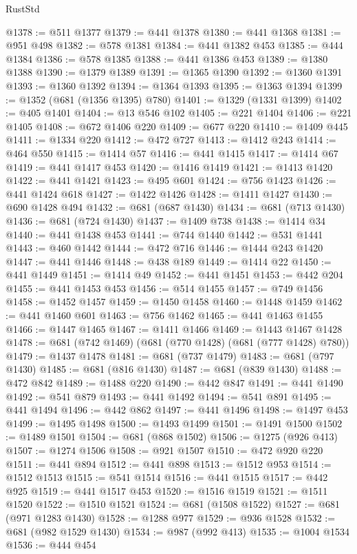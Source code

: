 \begin{lexlean}{RustStd}
\begin{coremodule}
{\begin{coremodule}
{{{{{{{{{{{{{{{{{{{{{{{{{@1378 := @511 @1377
@1379 := @441 @1378
@1380 := @441 @1368
@1381 := @951 @498
@1382 := @578 @1381
@1384 := @441 @1382 @453
@1385 := @444 @1384
@1386 := @578 @1385
@1388 := @441 @1386 @453
@1389 := @1380 @1388
@1390 := @1379 @1389
@1391 := @1365 @1390
@1392 := @1360 @1391
@1393 := @1360 @1392
@1394 := @1364 @1393
@1395 := @1363 @1394
@1399 := @1352 (@681 (@1356 @1395) @780)
@1401 := @1329 (@1331 @1399)
@1402 := @405 @1401
@1404 := @13 @546 @102
@1405 := @221 @1404
@1406 := @221 @1405
@1408 := @672 @1406 @220
@1409 := @677 @220
@1410 := @1409 @445
@1411 := @1334 @220
@1412 := @472 @727
@1413 := @1412 @243
@1414 := @464 @550
@1415 := @1414 @57
@1416 := @441 @1415
@1417 := @1414 @67
@1419 := @441 @1417 @453
@1420 := @1416 @1419
@1421 := @1413 @1420
@1422 := @441 @1421
@1423 := @495 @601
@1424 := @756 @1423
@1426 := @441 @1424 @618
@1427 := @1422 @1426
@1428 := @1411 @1427
@1430 := @690 @1428 @494
@1432 := @681 (@687 @1430)
@1434 := @681 (@713 @1430)
@1436 := @681 (@724 @1430)
@1437 := @1409 @738
@1438 := @1414 @34
@1440 := @441 @1438 @453
@1441 := @744 @1440
@1442 := @531 @1441
@1443 := @460 @1442
@1444 := @472 @716
@1446 := @1444 @243 @1420
@1447 := @441 @1446
@1448 := @438 @189
@1449 := @1414 @22
@1450 := @441 @1449
@1451 := @1414 @49
@1452 := @441 @1451
@1453 := @442 @204
@1455 := @441 @1453 @453
@1456 := @514 @1455
@1457 := @749 @1456
@1458 := @1452 @1457
@1459 := @1450 @1458
@1460 := @1448 @1459
@1462 := @441 @1460 @601
@1463 := @756 @1462
@1465 := @441 @1463 @1455
@1466 := @1447 @1465
@1467 := @1411 @1466
@1469 := @1443 @1467 @1428
@1478 := @681 (@742 @1469) (@681 (@770 @1428) (@681 (@777 @1428) @780))
@1479 := @1437 @1478
@1481 := @681 (@737 @1479)
@1483 := @681 (@797 @1430)
@1485 := @681 (@816 @1430)
@1487 := @681 (@839 @1430)
@1488 := @472 @842
@1489 := @1488 @220
@1490 := @442 @847
@1491 := @441 @1490
@1492 := @541 @879
@1493 := @441 @1492
@1494 := @541 @891
@1495 := @441 @1494
@1496 := @442 @862
@1497 := @441 @1496
@1498 := @1497 @453
@1499 := @1495 @1498
@1500 := @1493 @1499
@1501 := @1491 @1500
@1502 := @1489 @1501
@1504 := @681 (@868 @1502)
@1506 := @1275 (@926 @413)
@1507 := @1274 @1506
@1508 := @921 @1507
@1510 := @472 @920 @220
@1511 := @441 @894
@1512 := @441 @898
@1513 := @1512 @953
@1514 := @1512 @1513
@1515 := @541 @1514
@1516 := @441 @1515
@1517 := @442 @925
@1519 := @441 @1517 @453
@1520 := @1516 @1519
@1521 := @1511 @1520
@1522 := @1510 @1521
@1524 := @681 (@1508 @1522)
@1527 := @681 (@971 @1283 @1430)
@1528 := @1288 @977
@1529 := @936 @1528
@1532 := @681 (@982 @1529 @1430)
@1534 := @987 (@992 @413)
@1535 := @1004 @1534
@1536 := @444 @454
}}}}}}}}}}}}}}}}}}}}}}}}}
\end{coremodule}}
\end{coremodule}
\end{lexlean}

